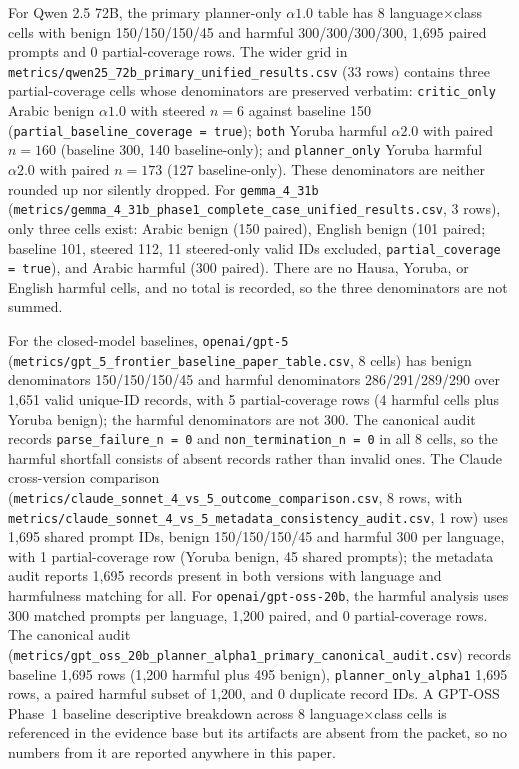 For Qwen 2.5 72B, the primary planner-only $\alpha1.0$ table has 8
language$\times$class cells with benign 150/150/150/45 and harmful
300/300/300/300, 1{,}695 paired prompts and 0 partial-coverage rows. The wider
grid in \texttt{metrics/qwen25\_72b\_primary\_unified\_results.csv} (33 rows)
contains three partial-coverage cells whose denominators are preserved verbatim:
\texttt{critic\_only} Arabic benign $\alpha1.0$ with steered $n = 6$ against
baseline 150 (\texttt{partial\_baseline\_coverage = true}); \texttt{both} Yoruba
harmful $\alpha2.0$ with paired $n = 160$ (baseline 300, 140 baseline-only); and
\texttt{planner\_only} Yoruba harmful $\alpha2.0$ with paired $n = 173$ (127
baseline-only). These denominators are neither rounded up nor silently dropped.
For \texttt{gemma\_4\_31b}
(\texttt{metrics/gemma\_4\_31b\_phase1\_complete\_case\_unified\_results.csv},
3 rows), only three cells exist: Arabic benign (150 paired), English benign
(101 paired; baseline 101, steered 112, 11 steered-only valid IDs excluded,
\texttt{partial\_coverage = true}), and Arabic harmful (300 paired). There
are no Hausa, Yoruba, or English harmful cells, and no total is recorded, so the
three denominators are not summed.

For the closed-model baselines, \texttt{openai/gpt-5}
(\texttt{metrics/gpt\_5\_frontier\_baseline\_paper\_table.csv}, 8 cells) has
benign denominators 150/150/150/45 and harmful denominators 286/291/289/290 over
1{,}651 valid unique-ID records, with 5 partial-coverage rows (4 harmful cells
plus Yoruba benign); the harmful denominators are not 300. The canonical audit
records \texttt{parse\_failure\_n = 0} and \texttt{non\_termination\_n = 0} in all
8 cells, so the harmful shortfall consists of absent records rather than invalid
ones. The Claude cross-version comparison
(\texttt{metrics/claude\_sonnet\_4\_vs\_5\_outcome\_comparison.csv}, 8 rows,
with \texttt{metrics/claude\_sonnet\_4\_vs\_5\_metadata\_consistency\_audit.csv},
1 row) uses 1{,}695 shared prompt IDs, benign 150/150/150/45 and harmful 300 per
language, with 1 partial-coverage row (Yoruba benign, 45 shared prompts); the
metadata audit reports 1{,}695 records present in both versions with language and
harmfulness matching for all. For \texttt{openai/gpt-oss-20b}, the harmful
analysis uses 300 matched prompts per language, 1{,}200 paired, and 0
partial-coverage rows. The canonical audit
(\texttt{metrics/gpt\_oss\_20b\_planner\_alpha1\_primary\_canonical\_audit.csv})
records baseline 1{,}695 rows (1{,}200 harmful plus 495 benign),
\texttt{planner\_only\_alpha1} 1{,}695 rows, a paired harmful subset of 1{,}200,
and 0 duplicate record IDs. A GPT-OSS Phase~1 baseline descriptive breakdown
across 8 language$\times$class cells is referenced in the evidence base but its
artifacts are absent from the packet, so no numbers from it are reported
anywhere in this paper.

